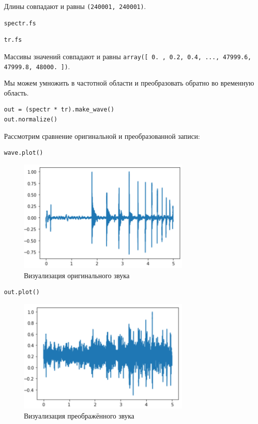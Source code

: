 \documentclass[a4paper,12pt]{report}
\begin{document}
Длины совпадают и равны \texttt{(240001, 240001)}.

\begin{lstlisting}[caption=Длина первой записи]
spectr.fs
\end{lstlisting}

\begin{lstlisting}[caption=Длина второй записи]
tr.fs
\end{lstlisting}

Массивы значений совпадают и равны \texttt{array([    0. ,     0.2,     0.4, ..., 47999.6, 47999.8, 48000. ])}.

Мы можем умножить в частотной области и преобразовать обратно во временную область.

\begin{lstlisting}[caption=Перемножение]
out = (spectr * tr).make_wave()
out.normalize()
\end{lstlisting}

Рассмотрим сравнение оригинальной и преобразованной записи:

\begin{lstlisting}[caption=Визуализация оригинального звука]
wave.plot()
\end{lstlisting}

\begin{figure}[H]
        \centering
        \includegraphics[width=0.75\textwidth]{13.png}
        \caption{Визуализация оригинального звука}
        \label{13}
\end{figure}

\begin{lstlisting}[caption=Визуализация преображённого звука]
out.plot()
\end{lstlisting}

\begin{figure}[H]
        \centering
        \includegraphics[width=0.75\textwidth]{14.png}
        \caption{Визуализация преображённого звука}
        \label{14}
\end{figure}
\end{document}

